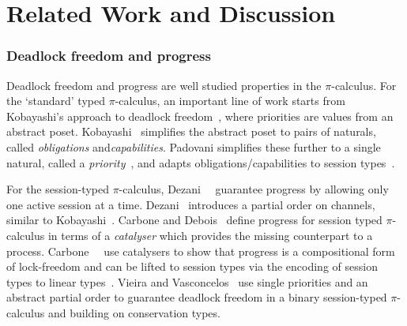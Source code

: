 \documentclass[main.tex]{subfiles}
\begin{document}
\section{Related Work and Discussion}

\subsubsection*{Deadlock freedom and progress}
Deadlock freedom and progress are well studied properties in the $\pi$-calculus.
For the `standard' typed $\pi$-calculus, an important line of work starts from Kobayashi's approach to deadlock freedom~\cite{kobayashi98}, where priorities are values from an abstract poset. Kobayashi~\cite{kobayashi06} simplifies the abstract poset to pairs of naturals, called \emph{obligations} and\emph{capabilities}. Padovani simplifies these further to a single natural, called a \emph{priority}~\cite{padovani14}, and adapts obligations/capabilities to session types~\cite{padovani13}.


For the session-typed $\pi$-calculus, Dezani~\etal~\cite{dezani-ciancaglinimostrous06} guarantee progress by allowing only one active session at a time. Dezani~\cite{dezani-ciancagliniliguoro09progress} introduces a partial order on channels, similar to Kobayashi~\cite{kobayashi98}.
Carbone and Debois~\cite{carbonedebois10} define progress for session typed $\pi$-calculus in terms of a \emph{catalyser} which provides the missing counterpart to a process. Carbone~\etal~\cite{carbonedardha14} use catalysers to show that progress is a compositional form of lock-freedom and can be lifted to session types via the encoding of session types to linear types~\cite{kobayashi07,dardhagiachino12,dardha14beat}.
Vieira and Vasconcelos~\cite{vieiravasconcelos13} use single priorities and an abstract partial order to guarantee deadlock freedom in a binary session-typed $\pi$-calculus and building on conservation types.
\end{document}
